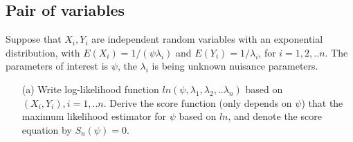 \documentclass[11pt]{article} %
\begin{document}
\subsection{Pair of variables}
Suppose that $X_i, Y_i$ are independent random variables with an exponential distribution, with $E(X_i)= 1/(\psi \lambda_i)$ and $E(Y_i) = 1/\lambda_i$, for $i=1,2,..n$. The parameters of interest is $\psi$, the $\lambda_i$ is being unknown nuisance parameters.

\begin{itemize}
	\item [(a)] Write log-likelihood function $ln(\psi, \lambda_1, \lambda_2, ..\lambda_n)$ based on $(X_i, Y_i), i=1,..n$. Derive the score function (only depends on $\psi$) that the maximum likelihood estimator for $\psi$ based on $ln$, and denote the score equation by $S_n(\psi) = 0$.
	
\end{itemize}
  
\end{document}
